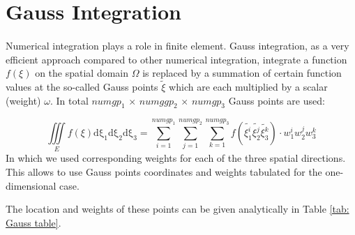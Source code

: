 \section{Gauss Integration}
\paragraph{}
Numerical integration plays a role in finite element. Gauss integration, as a very efficient approach compared to other numerical integration, integrate a function $f(\xi)$ on the spatial domain $\Omega$ is replaced by a summation of certain function values at the so-called Gauss points $\tilde{\xi}$ which are each multiplied by a scalar (weight) $\omega$. In total $numgp_1$ $\times$ $numggp_2$ $\times$ $numgp_3$ Gauss points are used:

\begin{equation}
\iiint \limits_E f\left(\xi\right) \mathrm{d\xi_1}\mathrm{d\xi_2}\mathrm{d\xi_3} = \displaystyle\sum_{i=1}^{numgp_1}\displaystyle\sum_{j=1}^{numgp_2} \displaystyle\sum_{k=1}^{numgp_3} f\left(\tilde{\xi_1^i}\tilde{\xi_2^j}\tilde{\xi_3^k}\right)\cdot w_1^i w_2^j w_3^k 
\end{equation}
In which we used corresponding weights for each of the three spatial directions. This allows to use Gauss points coordinates and weights tabulated for the one-dimensional case.

The location and weights of these points can be given analytically in Table \ref{tab: Gauss table}.

